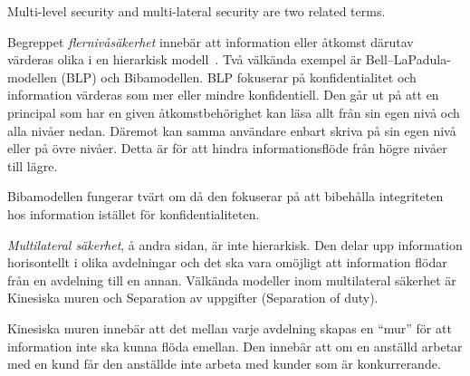 \documentclass[a4paper,addpoints]{exam}
\begin{document}
\begin{questions}
  \question\label{q:lvlltrl:E:C:A}
  Multi-level security and multi-lateral security are two related terms.

  \begin{solution}
    Begreppet \emph{flernivåsäkerhet} innebär att information eller åtkomst 
    därutav värderas olika i en hierarkisk modell~\cite[kap.\ 
    8]{Anderson2008sea}.
    Två välkända exempel är Bell--LaPadula-modellen (BLP) och Bibamodellen.
    BLP fokuserar på konfidentialitet och information värderas som mer eller 
    mindre konfidentiell.
    Den går ut på att en principal som har en given åtkomstbehörighet kan läsa 
    allt från sin egen nivå och alla nivåer nedan.
    Däremot kan samma användare enbart skriva på sin egen nivå eller på övre 
    nivåer.
    Detta är för att hindra informationsflöde från högre nivåer till lägre.

    Bibamodellen fungerar tvärt om då den fokuserar på att bibehålla 
    integriteten hos information istället för konfidentialiteten.

    \emph{Multilateral säkerhet}, å andra sidan, är inte hierarkisk.
    Den delar upp information horisontellt i olika avdelningar och det ska vara 
    omöjligt att information flödar från en avdelning till en annan.
    Välkända modeller inom multilateral säkerhet är Kinesiska muren och 
    Separation av uppgifter (\foreignlanguage{english}{Separation of duty}).

    Kinesiska muren innebär att det mellan varje avdelning skapas en 
    \enquote{mur} för att information inte ska kunna flöda emellan.
    Den innebär att om en anställd arbetar med en kund får den anställde inte 
    arbeta med kunder som är konkurrerande.


\end{solution}
\end{questions}
\end{document}
